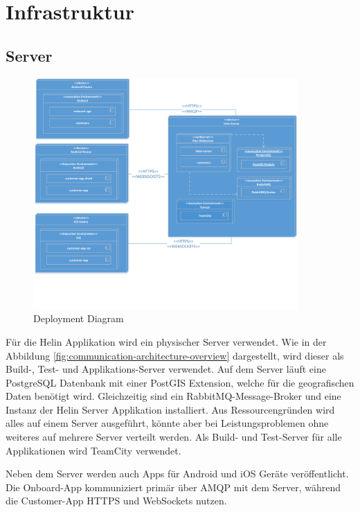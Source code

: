 \newpage

\chapter{Infrastruktur}

\section{Server}

\begin{figure}[H]
	\centering
	\includegraphics[width=0.9\textwidth]{images/DeploymentDiagram.pdf}
	\caption{Deployment Diagram}
	\label{fig:deployment-diagram}
\end{figure}

Für die Helin Applikation wird ein physischer Server verwendet. Wie in der Abbildung \ref{fig:communication-architecture-overview} dargestellt, wird dieser als Build-, Test- und Applikations-Server verwendet. 
Auf dem Server läuft eine PostgreSQL Datenbank mit einer PostGIS Extension, welche für die geografischen Daten benötigt wird. Gleichzeitig sind ein RabbitMQ-Message-Broker und eine Instanz der Helin Server Applikation installiert. Aus Ressourcengründen wird alles auf einem Server ausgeführt, könnte aber bei Leistungsproblemen ohne weiteres auf mehrere Server verteilt werden. Als Build- und Test-Server für alle Applikationen wird TeamCity verwendet. 

Neben dem Server werden auch Apps für Android und iOS Geräte veröffentlicht. Die Onboard-App kommuniziert primär über AMQP mit dem Server, während die Customer-App HTTPS und WebSockets nutzen.



